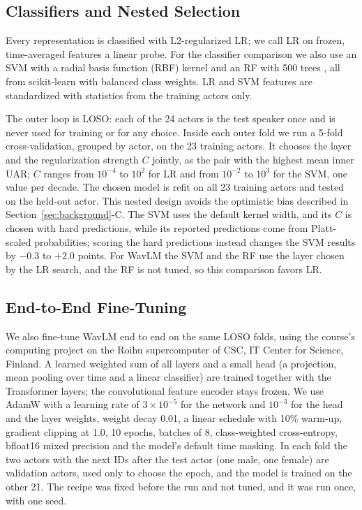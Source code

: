 \documentclass[journal]{IEEEtran}
\begin{document}
\subsection{Classifiers and Nested Selection}
Every representation is classified with L2-regularized LR; we call LR on frozen, time-averaged features a linear probe. For the classifier comparison we also use an SVM with a radial basis function (RBF) kernel \cite{cortes1995svm} and an RF with 500 trees \cite{breiman2001rf}, all from scikit-learn \cite{pedregosa2011sklearn} with balanced class weights. LR and SVM features are standardized with statistics from the training actors only.

The outer loop is LOSO: each of the 24 actors is the test speaker once and is never used for training or for any choice. Inside each outer fold we run a 5-fold cross-validation, grouped by actor, on the 23 training actors. It chooses the layer and the regularization strength $C$ jointly, as the pair with the highest mean inner UAR; $C$ ranges from $10^{-4}$ to $10^{2}$ for LR and from $10^{-2}$ to $10^{3}$ for the SVM, one value per decade. The chosen model is refit on all 23 training actors and tested on the held-out actor. This nested design avoids the optimistic bias described in Section~\ref{sec:background}-C. The SVM uses the default kernel width, and its $C$ is chosen with hard predictions, while its reported predictions come from Platt-scaled probabilities; scoring the hard predictions instead changes the SVM results by $-0.3$ to $+2.0$ points. For WavLM the SVM and the RF use the layer chosen by the LR search, and the RF is not tuned, so this comparison favors LR.

\subsection{End-to-End Fine-Tuning}
We also fine-tune WavLM end to end on the same LOSO folds, using the course's computing project on the Roihu supercomputer of CSC, IT Center for Science, Finland. A learned weighted sum of all layers and a small head (a projection, mean pooling over time and a linear classifier) are trained together with the Transformer layers; the convolutional feature encoder stays frozen. We use AdamW with a learning rate of $3 \times 10^{-5}$ for the network and $10^{-3}$ for the head and the layer weights, weight decay 0.01, a linear schedule with 10\% warm-up, gradient clipping at 1.0, 10 epochs, batches of 8, class-weighted cross-entropy, bfloat16 mixed precision and the model's default time masking. In each fold the two actors with the next IDs after the test actor (one male, one female) are validation actors, used only to choose the epoch, and the model is trained on the other 21. The recipe was fixed before the run and not tuned, and it was run once, with one seed.
\end{document}

